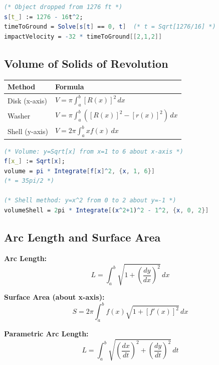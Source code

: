 \documentclass[12pt,a4paper]{article}
\begin{document}
\begin{mathematicabox}
    \begin{lstlisting}[language=Mathematica, basicstyle=\ttfamily\small]
(* Object dropped from 1276 ft *)
s[t_] := 1276 - 16t^2;
timeToGround = Solve[s[t] == 0, t]  (* t = Sqrt[1276/16] *)
impactVelocity = -32 * timeToGround[[2,1,2]]
    \end{lstlisting}
\end{mathematicabox}

\subsection{Volume of Solids of Revolution}

\begin{definitionbox}
    \begin{tabular}{|p{4cm}|p{10cm}|}
        \hline
        \textbf{Method} & \textbf{Formula} \\
        \hline
        Disk (x-axis) & \(V = \pi \int_a^b [R(x)]^2\,dx\) \\
        Washer & \(V = \pi \int_a^b ([R(x)]^2 - [r(x)]^2)\,dx\) \\
        Shell (y-axis) & \(V = 2\pi \int_a^b x f(x)\,dx\) \\
        \hline
    \end{tabular}
\end{definitionbox}

\begin{mathematicabox}
    \begin{lstlisting}[language=Mathematica, basicstyle=\ttfamily\small]
(* Volume: y=Sqrt[x] from x=1 to 6 about x-axis *)
f[x_] := Sqrt[x];
volume = pi * Integrate[f[x]^2, {x, 1, 6}]
(* = 35pi/2 *)

(* Shell method: y=x^2 from 0 to 2 about y=-1 *)
volumeShell = 2pi * Integrate[(x^2+1)^2 - 1^2, {x, 0, 2}]
    \end{lstlisting}
\end{mathematicabox}

\subsection{Arc Length and Surface Area}

\begin{formulabox}
    \textbf{Arc Length:}
    \[ L = \int_a^b \sqrt{1 + \left(\frac{dy}{dx}\right)^2}\,dx \]
    
    \textbf{Surface Area (about x-axis):}
    \[ S = 2\pi \int_a^b f(x) \sqrt{1 + [f'(x)]^2}\,dx \]
    
    \textbf{Parametric Arc Length:}
    \[ L = \int_a^b \sqrt{\left(\frac{dx}{dt}\right)^2 + \left(\frac{dy}{dt}\right)^2}\,dt \]
\end{formulabox}
\end{document}
